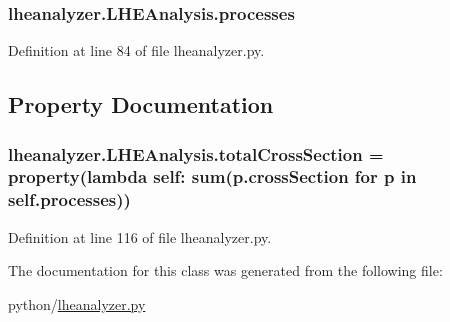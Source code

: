 \subsubsection[{processes}]{\setlength{\rightskip}{0pt plus 5cm}lheanalyzer.\-L\-H\-E\-Analysis.\-processes}\label{classlheanalyzer_1_1LHEAnalysis_a9bf0d422138673c233f45ddf58a82941}


Definition at line 84 of file lheanalyzer.\-py.



\subsection{Property Documentation}
\subsubsection[{total\-Cross\-Section}]{\setlength{\rightskip}{0pt plus 5cm}lheanalyzer.\-L\-H\-E\-Analysis.\-total\-Cross\-Section = property(lambda self\-: sum(p.\-cross\-Section for p in self.\-processes))\hspace{0.3cm}{\ttfamily [static]}}\label{classlheanalyzer_1_1LHEAnalysis_ab3e70c72f5d23349ee34f5dc59e71a93}


Definition at line 116 of file lheanalyzer.\-py.



The documentation for this class was generated from the following file\-:\begin{DoxyCompactItemize}
\item 
python/\hyperlink{lheanalyzer_8py}{lheanalyzer.\-py}\end{DoxyCompactItemize}
